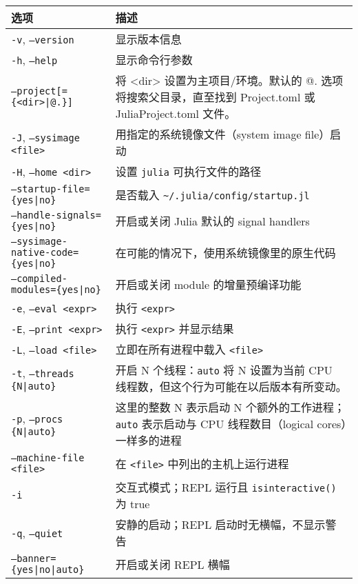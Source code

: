 \begin{table}[h]

\begin{tabulary}{\linewidth}{|L|L|}
\hline
选项 & 描述 \\
\hline
\texttt{-v}, \texttt{--version} & 显示版本信息 \\
\hline
\texttt{-h}, \texttt{--help} & 显示命令行参数 \\
\hline
\texttt{--project[=\{<dir>|@.\}]} & 将 <dir> 设置为主项目/环境。默认的 @. 选项将搜索父目录，直至找到 Project.toml 或 JuliaProject.toml 文件。 \\
\hline
\texttt{-J}, \texttt{--sysimage <file>} & 用指定的系统镜像文件（system image file）启动 \\
\hline
\texttt{-H}, \texttt{--home <dir>} & 设置 \texttt{julia} 可执行文件的路径 \\
\hline
\texttt{--startup-file=\{yes|no\}} & 是否载入 \texttt{{\textasciitilde}/.julia/config/startup.jl} \\
\hline
\texttt{--handle-signals=\{yes|no\}} & 开启或关闭 Julia 默认的 signal handlers \\
\hline
\texttt{--sysimage-native-code=\{yes|no\}} & 在可能的情况下，使用系统镜像里的原生代码 \\
\hline
\texttt{--compiled-modules=\{yes|no\}} & 开启或关闭 module 的增量预编译功能 \\
\hline
\texttt{-e}, \texttt{--eval <expr>} & 执行 \texttt{<expr>} \\
\hline
\texttt{-E}, \texttt{--print <expr>} & 执行 \texttt{<expr>} 并显示结果 \\
\hline
\texttt{-L}, \texttt{--load <file>} & 立即在所有进程中载入 \texttt{<file>} \\
\hline
\texttt{-t}, \texttt{--threads \{N|auto\}} & 开启 N 个线程：\texttt{auto} 将 N 设置为当前 CPU 线程数，但这个行为可能在以后版本有所变动。 \\
\hline
\texttt{-p}, \texttt{--procs \{N|auto\}} & 这里的整数 N 表示启动 N 个额外的工作进程；\texttt{auto} 表示启动与 CPU 线程数目（logical cores）一样多的进程 \\
\hline
\texttt{--machine-file <file>} & 在 \texttt{<file>} 中列出的主机上运行进程 \\
\hline
\texttt{-i} & 交互式模式；REPL 运行且 \texttt{isinteractive()} 为 true \\
\hline
\texttt{-q}, \texttt{--quiet} & 安静的启动；REPL 启动时无横幅，不显示警告 \\
\hline
\texttt{--banner=\{yes|no|auto\}} & 开启或关闭 REPL 横幅 \\

\end{tabulary}
\end{table}
